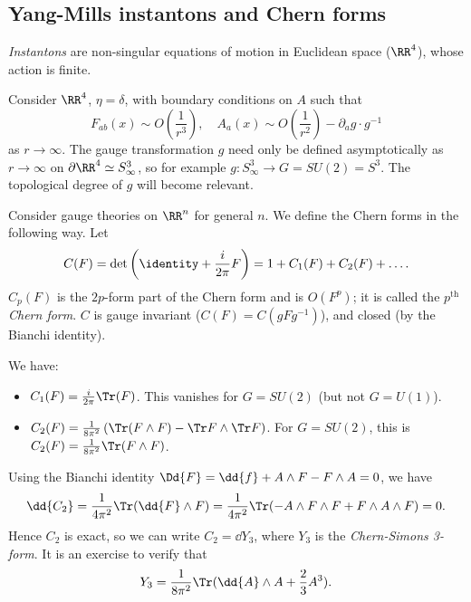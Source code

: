 \documentclass{jknotes}
\begin{document}
\subsection{Yang-Mills instantons and Chern forms}
\begin{defn}
    \emph{Instantons} are non-singular equations of motion in Euclidean space (\(\RR^4\)), whose action is finite.
\end{defn}

Consider \(\RR^4\), \(\eta=\delta\), with boundary conditions on \(A\) such that
\begin{equation}
    F_{ab}(x) \sim O\left(\frac{1}{r^3}\right),\quad
    A_a(x) \sim O\left(\frac{1}{r^2}\right) - \partial_a g \cdot g^{-1}
\end{equation}
as \(r \to \infty\). The gauge transformation \(g\) need only be defined asymptotically as \(r \to \infty\) on \(\partial\RR^4\simeq S^3_\infty\), so for example \(g:S^3_\infty \to G = SU(2)=S^3\). The topological degree of \(g\) will become relevant.

Consider gauge theories on \(\RR^n\) for general \(n\). We define the Chern forms in the following way. Let
\begin{equation}
    C(F) = \det \left(\identity + \frac{i}{2\pi}F\right) = 1 + C_1(F) + C_2(F) + \dots.
\end{equation}
\(C_p(F)\) is the \(2p\)-form part of the Chern form and is \(O(F^p)\); it is called the \emph{\(p^\text{th}\) Chern form}. \(C\) is gauge invariant (\(C(F) = C(gFg^{-1})\)), and closed (by the Bianchi identity).

We have:
\begin{itemize}
    \item \(C_1(F) = \frac{i}{2\pi}\Tr(F)\). This vanishes for \(G=SU(2)\) (but not \(G=U(1)\)).
    \item \(C_2(F) = \frac{1}{8\pi^2}\left(\Tr(F\wedge F) - \Tr F\wedge \Tr F\right)\). For \(G=SU(2)\), this is \(C_2(F) = \frac{1}{8\pi^2}\Tr(F\wedge F)\).
\end{itemize}
Using the Bianchi identity \(\Dd{F} = \dd{f} + A\wedge F - F\wedge A = 0\), we have
\begin{equation}
    \dd{C_2} = \frac{1}{4\pi^2}\Tr(\dd{F}\wedge F) = \frac{1}{4\pi^2}\Tr(-A\wedge F \wedge F + F \wedge A \wedge F) = 0.
\end{equation}
Hence \(C_2\) is exact, so we can write \(C_2 = \dd{Y_3}\), where \(Y_3\) is the \emph{Chern-Simons 3-form}. It is an exercise to verify that
\begin{equation}
    Y_3 = \frac{1}{8\pi^2}\Tr(\dd{A}\wedge A + \frac{2}{3}A^3).
\end{equation}
\end{document}
